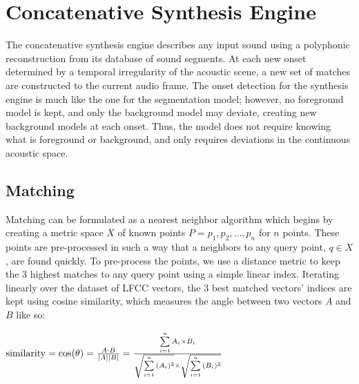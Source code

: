 \documentclass[a4paper,10pt,final]{ThesisStyle}
\begin{document}

\section{Concatenative Synthesis Engine}

The concatenative synthesis engine describes any input sound using a polyphonic reconstruction from its database of sound segments.  At each new onset determined by a temporal irregularity of the acoustic scene, a new set of matches are constructed to the current audio frame.  The onset detection for the synthesis engine is much like the one for the segmentation model; however, no foreground model is kept, and only the background model may deviate, creating new background models at each onset.  Thus, the model does not require knowing what is foreground or background, and only requires deviations in the continuous acoustic space.  


\subsection{Matching}

Matching can be formulated as a nearest neighbor algorithm which begins by creating a metric space $X$ of known points $P = p_1, p_2, ..., p_n$ for $n$ points.  These points are pre-processed in such a way that a neighbors to any query point, $q \in X$, are found quickly.  To pre-process the points, we use a distance metric to keep the 3 highest matches to any query point using a simple linear index.  Iterating linearly over the dataset of LFCC vectors, the 3 best matched vectors' indices are kept using cosine similarity, which measures the angle between two vectors $A$ and $B$ like so:

\begin{math}
\textnormal{similarity} = \cos(\theta) = {A \cdot B \over |A| |B|} = \frac{ \sum\limits_{i=1}^{n}{A_i \times B_i} }{ \\ \sqrt{\sum\limits_{i=1}^{n}{(A_i)^2}} \times \sqrt{\sum\limits_{i=1}^{n}{(B_i)^2}}} 
\end{math}
\end{document}
